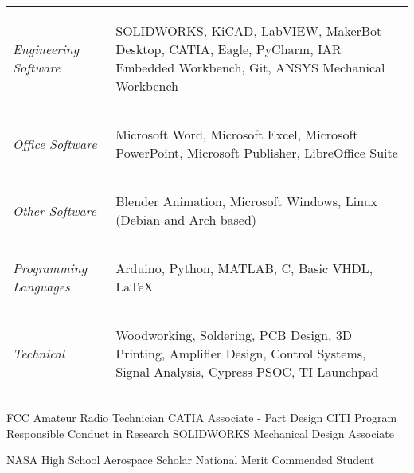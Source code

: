 \documentclass[letterpaper,ddMMMyyyy,nonstopmode]{simpleresumecv}
\newcommand{\tableWidth}{23.5em}
\begin{document}
\begin{Body}
		\Gap
            \def\arraystretch{0}%
            \hspace*{-0.8em}
            \begin{tabular}[t]{p{11em} p{\tableWidth}}
                \textit{Engineering Software} &
                \begin{Detail}
                    SOLIDWORKS, KiCAD, LabVIEW, MakerBot Desktop, CATIA, Eagle, PyCharm, IAR Embedded Workbench, Git, ANSYS Mechanical Workbench
                \end{Detail}\\
                \textit{Office Software} &
                \begin{Detail}
                    Microsoft Word, Microsoft Excel, Microsoft PowerPoint, Microsoft Publisher, LibreOffice Suite
                \end{Detail}\\
                \textit{Other Software}&
                \begin{Detail}
                    Blender Animation, Microsoft Windows, Linux (Debian and Arch based)
                \end{Detail}\\
                \textit{Programming Languages} &
                \begin{Detail}
                    Arduino, Python, MATLAB, C, Basic VHDL, LaTeX
                \end{Detail}\\
                \textit{Technical}&
                \begin{Detail}
                    Woodworking, Soldering, PCB Design, 3D Printing, Amplifier Design, Control Systems, Signal Analysis, Cypress PSOC, TI Launchpad
                \end{Detail}
                \vspace{-1em}

            \end{tabular} %


		    \Entry FCC Amateur Radio Technician
		    \Entry CATIA Associate - Part Design
		    \Entry CITI Program Responsible Conduct in Research
		    \Entry SOLIDWORKS Mechanical Design Associate



		    \Entry NASA High School Aerospace Scholar
		    \Entry National Merit Commended Student
	\end{Body}
\end{document}
